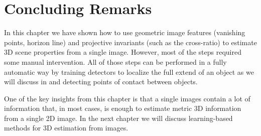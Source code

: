 


\section{Concluding Remarks}

In this chapter we have shown how to use geometric image features (vanishing points, horizon line) and projective invariants (such as the cross-ratio) to estimate 3D scene properties from a single image. However, most of the steps required some manual intervention. All of those steps can be performed in a fully automatic way by training detectors to localize the full extend of an object as we will discuss in \chap{\ref{chapter:object_recognition}} and detecting points of contact between objects. 

One of the key insights from this chapter is that a single images contain a lot of information that, in most cases, is enough to estimate metric 3D information from a single 2D image. In the next chapter we will discuss learning-based methods for 3D estimation from images. 